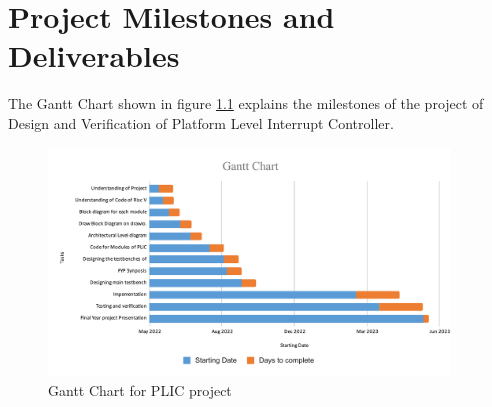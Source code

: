 
\chapter{Project Milestones and Deliverables}
\label{Chapter6}

The Gantt Chart shown in figure  \ref{fig:plic_ganttchart} explains the milestones of the project of Design and Verification of Platform Level Interrupt Controller.\\

\begin{figure}[h!]
  \centering
  \includegraphics[width=0.95\textwidth]{./fatima_figures/Gantt Chart.pdf}
  \caption{Gantt Chart for PLIC project}
  \label{fig:plic_ganttchart}
\end{figure}



